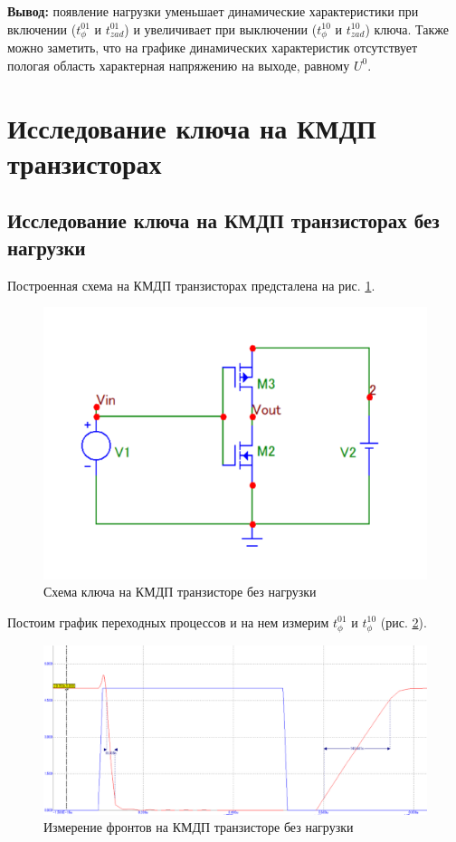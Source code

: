 \documentclass[a4paper,14pt]{article}
\begin{document}
\textbf{Вывод: } появление нагрузки уменьшает динамические характеристики при включении ($t^{01}_{\phi}$ и $t^{01}_{zad}$) и увеличивает при выключении ($t^{10}_{\phi}$ и $t^{10}_{zad}$) ключа. Также можно заметить, что на графике динамических характеристик отсутствует пологая область характерная напряжению на выходе, равному $U^0$.



\section{Исследование ключа на КМДП транзисторах}
\subsection{Исследование ключа на КМДП транзисторах без нагрузки}

Построенная схема на КМДП транзисторах предсталена на рис. \ref{fig:kmdpsh}.

\begin{figure}[H]
	\centering
	\includegraphics[width=0.7\linewidth]{image/KMDP_sh}
	\caption{Схема ключа на КМДП транзисторе без нагрузки}
	\label{fig:kmdpsh}
\end{figure}


Постоим график переходных процессов и на нем измерим $t^{01}_{\phi}$ и $t^{10}_{\phi}$ (рис.  \ref{fig:kmdpgraffr}).

\begin{figure}[H]
	\centering
	\includegraphics[width=0.7\linewidth]{image/KMDP_graf_fr}
	\caption{Измерение фронтов на КМДП транзисторе без нагрузки}
	\label{fig:kmdpgraffr}
\end{figure}
\end{document}
